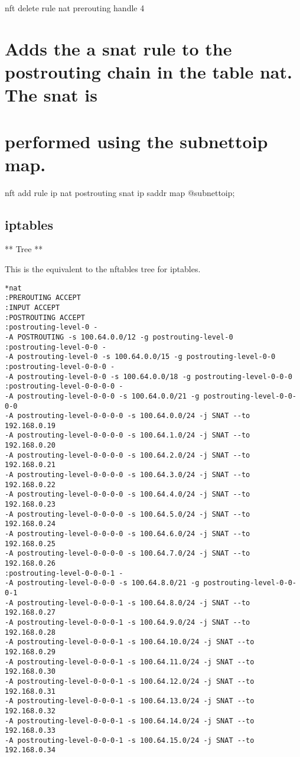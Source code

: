 \begin{itemize}
  nft delete rule nat prerouting handle 4

  \section{Adds the a snat rule to the postrouting chain in the table
  nat. The snat
  is}\label{adds-the-a-snat-rule-to-the-postrouting-chain-in-the-table-nat.-the-snat-is}

  \section{performed using the subnettoip
  map.}\label{performed-using-the-subnettoip-map.}

  nft add rule ip nat postrouting snat ip saddr map @subnettoip;
\end{itemize}

\subsection{iptables}\label{iptables-1}

** Tree **

This is the equivalent to the nftables tree for iptables.

\begin{verbatim}
*nat
:PREROUTING ACCEPT
:INPUT ACCEPT
:POSTROUTING ACCEPT
:postrouting-level-0 -
-A POSTROUTING -s 100.64.0.0/12 -g postrouting-level-0
:postrouting-level-0-0 -
-A postrouting-level-0 -s 100.64.0.0/15 -g postrouting-level-0-0
:postrouting-level-0-0-0 -
-A postrouting-level-0-0 -s 100.64.0.0/18 -g postrouting-level-0-0-0
:postrouting-level-0-0-0-0 -
-A postrouting-level-0-0-0 -s 100.64.0.0/21 -g postrouting-level-0-0-0-0
-A postrouting-level-0-0-0-0 -s 100.64.0.0/24 -j SNAT --to 192.168.0.19
-A postrouting-level-0-0-0-0 -s 100.64.1.0/24 -j SNAT --to 192.168.0.20
-A postrouting-level-0-0-0-0 -s 100.64.2.0/24 -j SNAT --to 192.168.0.21
-A postrouting-level-0-0-0-0 -s 100.64.3.0/24 -j SNAT --to 192.168.0.22
-A postrouting-level-0-0-0-0 -s 100.64.4.0/24 -j SNAT --to 192.168.0.23
-A postrouting-level-0-0-0-0 -s 100.64.5.0/24 -j SNAT --to 192.168.0.24
-A postrouting-level-0-0-0-0 -s 100.64.6.0/24 -j SNAT --to 192.168.0.25
-A postrouting-level-0-0-0-0 -s 100.64.7.0/24 -j SNAT --to 192.168.0.26
:postrouting-level-0-0-0-1 -
-A postrouting-level-0-0-0 -s 100.64.8.0/21 -g postrouting-level-0-0-0-1
-A postrouting-level-0-0-0-1 -s 100.64.8.0/24 -j SNAT --to 192.168.0.27
-A postrouting-level-0-0-0-1 -s 100.64.9.0/24 -j SNAT --to 192.168.0.28
-A postrouting-level-0-0-0-1 -s 100.64.10.0/24 -j SNAT --to 192.168.0.29
-A postrouting-level-0-0-0-1 -s 100.64.11.0/24 -j SNAT --to 192.168.0.30
-A postrouting-level-0-0-0-1 -s 100.64.12.0/24 -j SNAT --to 192.168.0.31
-A postrouting-level-0-0-0-1 -s 100.64.13.0/24 -j SNAT --to 192.168.0.32
-A postrouting-level-0-0-0-1 -s 100.64.14.0/24 -j SNAT --to 192.168.0.33
-A postrouting-level-0-0-0-1 -s 100.64.15.0/24 -j SNAT --to 192.168.0.34
\end{verbatim}

